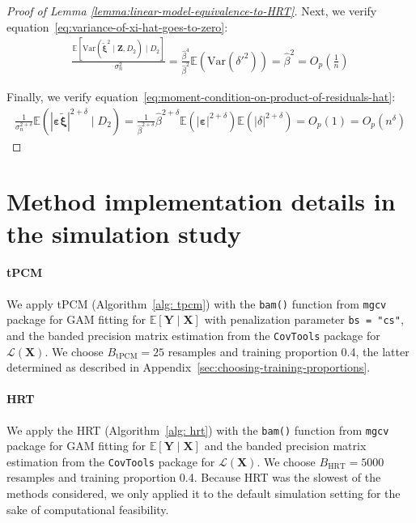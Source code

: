\documentclass[12pt]{article}
\theoremstyle{definition}
\theoremstyle{remark}
\newcommand{\E}{\mathbb E}								%
\newcommand{\V}{\mathrm{Var}}							%
\newcommand{\prx}{\bm X}								%
\newcommand{\prz}{\bm Z}								%
\newcommand{\pry}{{\bm Y}}								%
\newcommand{\peps}{\bm \varepsilon}						%
\newcommand{\pxi}{\bm \xi}						%
\newcommand{\law}{\mathcal L}							%
\begin{document}
\begin{proof}[Proof of Lemma \ref{lemma:linear-model-equivalence-to-HRT}]
Next, we verify equation~\eqref{eq:variance-of-xi-hat-goes-to-zero}:
\begin{align*}
	\frac{\E\left[\V(\widetilde{\pxi}^2 \mid \prz, D_2)\mid D_2\right]}{\sigma_n^2} = \frac{\widehat{\beta}^4}{\widehat{\beta}^2} \E(\V(\delta'^2)) =\widehat{\beta}^2 = O_p\left(\frac{1}{n}\right)
\end{align*}

Finally, we verify equation~\eqref{eq:moment-condition-on-product-of-residuals-hat}:
\begin{align*}
		\frac{1}{\sigma_n^{2+\delta}}\E( |\peps\widetilde{\pxi}|^{2+\delta} \mid D_2) = \frac{1}{\widehat \beta^{2 + \delta}} \widehat\beta^{2+\delta}  \E(|\peps|^{2+\delta}) \E(|\delta|^{2+\delta}) = O_p(1) = O_p(n^\delta)
\end{align*}

\end{proof}

\section{Method implementation details in the simulation study} \label{sec:simulation-study-details}
\paragraph{tPCM} We apply tPCM (Algorithm~\ref{alg: tpcm}) with the  \verb|bam()| function from \texttt{mgcv} package for GAM fitting for $\E[\pry \mid \prx]$ with penalization parameter \verb|bs = "cs"|, and the banded precision matrix estimation from the \texttt{CovTools} package for $\law(\prx)$. We choose $B_{\text{tPCM}} = 25$ resamples and training proportion 0.4, the latter determined as described in Appendix~\ref{sec:choosing-training-proportions}. 
	
	\paragraph{HRT} We apply the HRT (Algorithm~\ref{alg: hrt}) with the \verb|bam()| function from \texttt{mgcv} package for GAM fitting for $\E[\pry \mid \prx]$ and the banded precision matrix estimation from the \texttt{CovTools} package for $\law(\prx)$. We choose $B_{\text{HRT}} = 5000$ resamples and training proportion 0.4. Because HRT was the slowest of the methods considered, we only applied it to the default simulation setting for the sake of computational feasibility.
\end{document}
